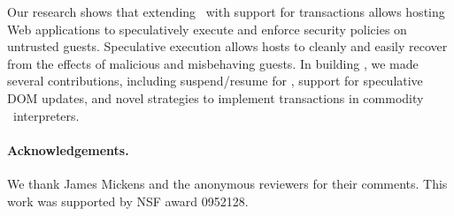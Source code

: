 \label{section:summary}

Our research shows that extending \js\ with support for transactions allows
hosting Web applications to speculatively execute and enforce security policies
on untrusted guests. Speculative execution allows hosts to cleanly and easily
recover from the effects of malicious and misbehaving guests. In building
\txjs, we made several contributions, including suspend/resume for \js, support
for speculative DOM updates, and novel strategies to implement transactions in
commodity \js\ interpreters.

\paragraph{Acknowledgements.} We thank James Mickens and the anonymous
reviewers for their comments. This work was supported by NSF award 0952128.
